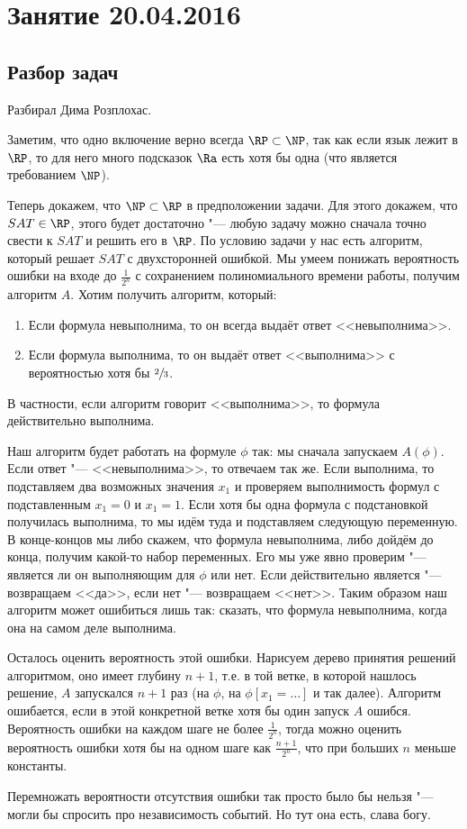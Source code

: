 \chapter{Занятие 20.04.2016}

\section{Разбор задач}
	Разбирал Дима Розплохас.

	Заметим, что одно включение верно всегда $\RP \subset \NP$,
	так как если язык лежит в $\RP$, то для него много подсказок $\Ra$
	есть хотя бы одна (что является требованием $\NP$).

	Теперь докажем, что $\NP \subset \RP$ в предположении задачи.
	Для этого докажем, что $SAT \in \RP$, этого будет достаточно "---
	любую задачу можно сначала точно свести к $SAT$ и решить его в $\RP$.
	По условию задачи у нас есть алгоритм, который решает $SAT$ с двухсторонней ошибкой.
	Мы умеем понижать вероятность ошибки на входе до $\frac{1}{2^n}$ с сохранением полиномиального времени работы,
	получим алгоритм $A$.
	Хотим получить алгоритм, который:
	\begin{enumerate}
		\item Если формула невыполнима, то он всегда выдаёт ответ <<невыполнима>>.
		\item Если формула выполнима, то он выдаёт ответ <<выполнима>> с вероятностью хотя бы $\sfrac 23$.
	\end{enumerate}
	В частности, если алгоритм говорит <<выполнима>>, то формула действительно выполнима.

	Наш алгоритм будет работать на формуле $\phi$ так: мы сначала запускаем $A(\phi)$.
	Если ответ "--- <<невыполнима>>, то отвечаем так же.
	Если выполнима, то подставляем два возможных значения $x_1$ и проверяем выполнимость формул
	с подставленным $x_1=0$ и $x_1=1$.
	Если хотя бы одна формула с подстановкой получилась выполнима, то мы идём туда и подставляем следующую переменную.
	В конце-концов мы либо скажем, что формула невыполнима, либо дойдём до конца, получим какой-то набор переменных.
	Его мы уже явно проверим "--- является ли он выполняющим для $\phi$ или нет.
	Если действительно является "--- возвращаем <<да>>, если нет "--- возвращаем <<нет>>.
	Таким образом наш алгоритм может ошибиться лишь так: сказать, что формула невыполнима, когда она на самом деле выполнима.

	Осталось оценить вероятность этой ошибки.
	Нарисуем дерево принятия решений алгоритмом, оно имеет глубину $n+1$, т.е. в той ветке,
	в которой нашлось решение, $A$ запускался $n+1$ раз (на $\phi$, на $\phi[x_1=\dots]$ и так далее).
	Алгоритм ошибается, если в этой конкретной ветке хотя бы один запуск $A$ ошибся.
	Вероятность ошибки на каждом шаге не более $\frac{1}{2^n}$, тогда можно оценить вероятность ошибки хотя бы на
	одном шаге как $\frac{n+1}{2^n}$, что при больших $n$ меньше константы.
	\begin{Rem}
		Перемножать вероятности отсутствия ошибки так просто было бы нельзя "--- могли бы спросить про независимость событий.
		Но тут она есть, слава богу.
	\end{Rem}

